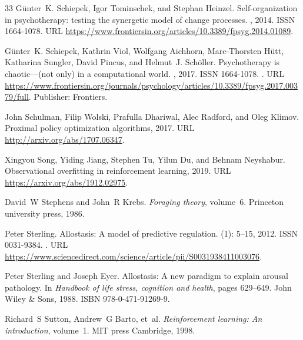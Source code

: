 \documentclass[12pt,fleqn]{article}
\begin{document}
\begin{thebibliography}{33}
  G\"unter~K. Schiepek, Igor Tominschek, and Stephan Heinzel.
  \newblock Self-organization in psychotherapy: testing the synergetic model of
  change processes.
  , 2014.
  \newblock ISSN 1664-1078.
  \newblock URL
  \url{https://www.frontiersin.org/articles/10.3389/fpsyg.2014.01089}.

  G\"unter~K. Schiepek, Kathrin Viol, Wolfgang Aichhorn, Marc-Thorsten H\"utt,
  Katharina Sungler, David Pincus, and Helmut~J. Sch\"oller.
  \newblock Psychotherapy is chaotic---(not only) in a computational world.
  , 2017.
  \newblock ISSN 1664-1078.
  \newblock {}.
  \newblock URL
  \url{https://www.frontiersin.org/journals/psychology/articles/10.3389/fpsyg.2017.00379/full}.
  \newblock Publisher: Frontiers.

  John Schulman, Filip Wolski, Prafulla Dhariwal, Alec Radford, and Oleg Klimov.
  \newblock Proximal policy optimization algorithms, 2017.
  \newblock URL \url{http://arxiv.org/abs/1707.06347}.

  Xingyou Song, Yiding Jiang, Stephen Tu, Yilun Du, and Behnam Neyshabur.
  \newblock Observational overfitting in reinforcement learning, 2019.
  \newblock URL \url{https://arxiv.org/abs/1912.02975}.

  David~W Stephens and John~R Krebs.
  \newblock \emph{Foraging theory}, volume~6.
  \newblock Princeton university press, 1986.

  Peter Sterling.
  \newblock Allostasis: A model of predictive regulation.
   (1): 5--15, 2012.
  \newblock ISSN 0031-9384.
  \newblock {}.
  \newblock URL
  \url{https://www.sciencedirect.com/science/article/pii/S0031938411003076}.

  Peter Sterling and Joseph Eyer.
  \newblock Allostasis: A new paradigm to explain arousal pathology.
  \newblock In \emph{Handbook of life stress, cognition and health}, pages
  629--649. John Wiley \& Sons, 1988.
  \newblock ISBN 978-0-471-91269-9.

  Richard~S Sutton, Andrew~G Barto, et~al.
  \newblock \emph{Reinforcement learning: An introduction}, volume~1.
  \newblock MIT press Cambridge, 1998.


\end{thebibliography}
\end{document}
